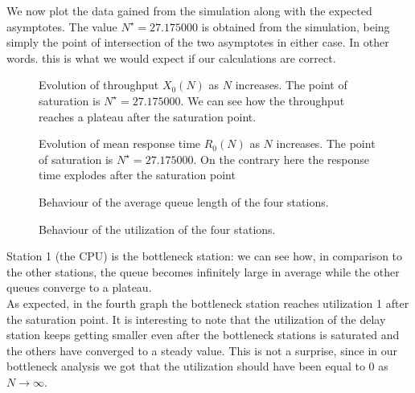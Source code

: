\documentclass[12pt]{article}
\begin{document}
We now plot the data gained from the simulation along with the expected asymptotes. The value $N^{\star}=27.175000$ is obtained from the simulation, being simply the point of intersection of the two asymptotes in either case. In other words. this is what we would expect if our calculations are correct.
\newcommand*{\ShowIntersection}{
	\fill 
	[name intersections={of=GraphCurve and HorizontalLine, name=i, total=\t}] 
	[red, opacity=1, every node/.style={above left, black, opacity=1}] 
	\foreach \s in {1,...,\t}{(i-\s) circle (2pt)
		node [above left] {\s}};
}
\begin{figure}[H]
	\centering
	
	\caption{Evolution of throughput $X_0(N)$ as $N$ increases. The point of saturation is $N^{\star}=27.175000$. We can see how the throughput reaches a plateau after the saturation point.}
\end{figure}
\begin{figure}[H]
	\centering
	
	\caption{Evolution of mean response time $R_0(N)$ as $N$ increases. The point of saturation is $N^{\star}=27.175000$. On the contrary here the response time explodes after the saturation point}
\end{figure}
\begin{figure}[H]
	\centering
	
	\caption{Behaviour of the average queue length of the four stations.}
\end{figure}
\begin{figure}[H]
	\centering
	
	\caption{Behaviour of the utilization of the four stations.}
\end{figure}
Station 1 (the CPU) is the bottleneck station: we can see how, in comparison to the other stations, the queue becomes infinitely large in average while the other queues converge to a plateau.\\
As expected, in the fourth graph the bottleneck station reaches utilization 1 after the saturation point. It is interesting to note that the utilization of the delay station keeps getting smaller even after the bottleneck stations is saturated and the others have converged to a steady value. This is not a surprise, since in our bottleneck analysis we got that the utilization should have been equal to 0 as $N\to\infty$.
\end{document}
